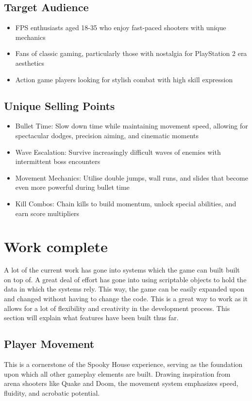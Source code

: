 \documentclass{article}
\begin{document}
    \subsection{Target Audience}
    \begin{itemize}
        \item FPS enthusiasts aged 18-35 who enjoy fast-paced shooters with unique mechanics
        \item Fans of classic gaming, particularly those with nostalgia for PlayStation 2 era aesthetics
        \item Action game players looking for stylish combat with high skill expression
    \end{itemize}

    \subsection{Unique Selling Points}
    \begin{itemize}
        \item Bullet Time: Slow down time while maintaining movement speed, allowing for spectacular dodges, precision aiming, and cinematic moments
        \item Wave Escalation: Survive increasingly difficult waves of enemies with intermittent boss encounters
        \item Movement Mechanics: Utilise double jumps, wall runs, and slides that become even more powerful during bullet time
        \item Kill Combos: Chain kills to build momentum, unlock special abilities, and earn score multipliers
    \end{itemize}


    \section{Work complete}
    A lot of the current work has gone into systems which the game can built built on top of. A great deal of effort has gone into using scriptable objects to hold the data in which the systems rely.
    This way, the game can be easily expanded upon and changed without having to change the code. This is a great way to work as it allows for a lot of flexibility and creativity in the development process.
    This section will explain what features have been built thus far.

    \subsection{Player Movement}
    This is a cornerstone of the Spooky House experience, serving as the foundation upon which all other gameplay elements are built. Drawing inspiration from arena shooters like Quake and Doom, the movement system emphasizes speed, fluidity, and acrobatic potential.
\end{document}

